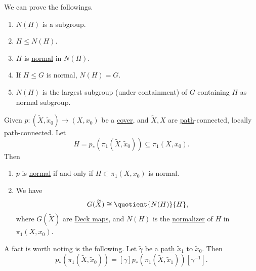 \begin{exercise}
	We can prove the followings.
	\begin{enumerate}
		\item \(N(H)\) is a subgroup.
		\item \(H\leq N(H)\).
		\item \(H\) is \underline{normal} in \(N(H)\).
		\item If \(H\leq G\) is normal, \(N(H) = G\).
		\item \(N(H)\) is the largest subgroup (under containment) of \(G\) containing \(H\) as normal subgroup.
	\end{enumerate}
\end{exercise}

\begin{proposition}\label{prop:lec17}
	Given \(p\colon (\widetilde{X} , \widetilde{x} _0)\to (X, x_0)\) be a \hyperref[def:covering-map]{cover}, and \(\widetilde{X} , X\)
	are \hyperref[def:path]{path}-connected, locally \hyperref[def:path]{path}-connected. Let
	\[
		H = p_\ast \left(\pi _1(\widetilde{X} , \widetilde{x} _0)\right)\subseteq \pi _1(X, x_0).
	\]
	Then
	\begin{enumerate}
		\item \(p\) is \hyperref[def:normal]{normal} if and only if \(H\subset \pi _1(X, x_0)\) is normal.
		\item We have
		      \[
			      G(\widetilde{X} )\cong \quotient{N(H)}{H},
		      \]
		      where \(G(\widetilde{X} )\) are \hyperref[def:deck-transformation]{Deck maps}, and \(N(H)\) is the \hyperref[def:normalizer]{normalizer}
		      of \(H\) in \(\pi _1(X, x_0)\).
	\end{enumerate}
\end{proposition}

\begin{remark}
	A fact is worth noting is the following. Let \(\widetilde{\gamma} \) be a \hyperref[def:path]{path} \(\widetilde{x} _1\) to \(\widetilde{x} _0\).
	Then
	\[
		p_\ast \left(\pi _1(\widetilde{X} , \widetilde{x} _0)\right)= [\gamma ] p_\ast \left(\pi _1(\widetilde{X} , \widetilde{x} _1)\right) [\gamma ^{-1}].
	\]
	\begin{figure}[H]
		\centering
		\label{fig:rmk:lec17:1}
	\end{figure}
\end{remark}